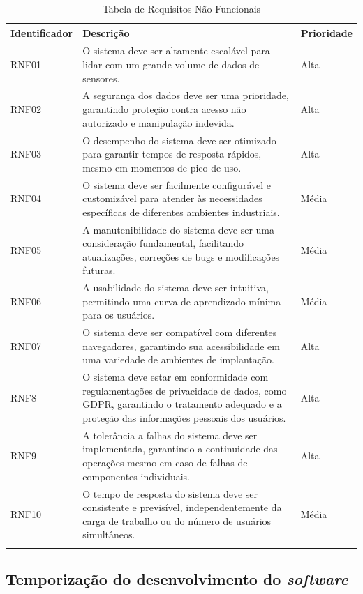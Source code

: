 {\fontsize{10}{12}\selectfont \begin{longtable}
{| p{} | p{} | p{} |} 
    \hline
    \textbf{Identificador} & \textbf{Descrição} & \textbf{Prioridade} \\
    \hline
    RNF01 & O sistema deve ser altamente escalável para lidar com um grande volume de dados de sensores. & Alta \\
    \hline
    RNF02 & A segurança dos dados deve ser uma prioridade, garantindo proteção contra acesso não autorizado e manipulação indevida. & Alta \\
    \hline
    RNF03 & O desempenho do sistema deve ser otimizado para garantir tempos de resposta rápidos, mesmo em momentos de pico de uso. & Alta \\
    \hline
    RNF04 & O sistema deve ser facilmente configurável e customizável para atender às necessidades específicas de diferentes ambientes industriais. & Média \\
    \hline
    RNF05 & A manutenibilidade do sistema deve ser uma consideração fundamental, facilitando atualizações, correções de bugs e modificações futuras. & Média \\
    \hline
    RNF06 & A usabilidade do sistema deve ser intuitiva, permitindo uma curva de aprendizado mínima para os usuários. & Média \\
    \hline
    RNF07 & O sistema deve ser compatível com diferentes navegadores, garantindo sua acessibilidade em uma variedade de ambientes de implantação. & Alta \\
    \hline
    RNF8 & O sistema deve estar em conformidade com regulamentações de privacidade de dados, como GDPR, garantindo o tratamento adequado e a proteção das informações pessoais dos usuários. & Alta \\
    \hline
    RNF9 & A tolerância a falhas do sistema deve ser implementada, garantindo a continuidade das operações mesmo em caso de falhas de componentes individuais. & Alta \\
    \hline
    RNF10 & O tempo de resposta do sistema deve ser consistente e previsível, independentemente da carga de trabalho ou do número de usuários simultâneos. & Média \\
    \hline
\caption{Tabela de Requisitos Não Funcionais} %
\label{tab:ReqNaoFuncional}
\end{longtable}}

\subsection{Temporização do desenvolvimento do \textit{software}}


